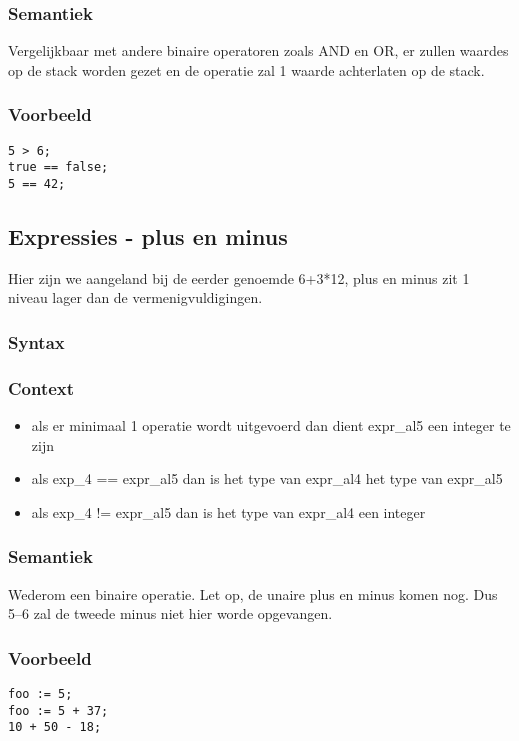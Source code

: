 \documentclass[]{article}
\begin{document}
\subsubsection{Semantiek}
Vergelijkbaar met andere binaire operatoren zoals AND en OR, er zullen waardes op de stack worden gezet en de operatie zal 1 waarde achterlaten op de stack.
\subsubsection{Voorbeeld}
\begin{lstlisting}[style=SELMA]
5 > 6;
true == false;
5 == 42;
\end{lstlisting}

\subsection{Expressies - plus en minus}
Hier zijn we aangeland bij de eerder genoemde 6+3*12, plus en minus zit 1 niveau lager dan de vermenigvuldigingen.
\subsubsection{Syntax}

\subsubsection{Context}
\begin{itemize}
\item als er minimaal 1 operatie wordt uitgevoerd dan dient expr\_al5 een integer te zijn
\item als exp\_4 == expr\_al5 dan is het type van expr\_al4 het type van expr\_al5
\item als exp\_4 != expr\_al5 dan is het type van expr\_al4 een integer
\end{itemize}
\subsubsection{Semantiek}
Wederom een binaire operatie. Let op, de unaire plus en minus komen nog. Dus 5--6 zal de tweede minus niet hier worde opgevangen.
\subsubsection{Voorbeeld}
\begin{lstlisting}[style=SELMA]
foo := 5;
foo := 5 + 37;
10 + 50 - 18;
\end{lstlisting}
\end{document}
